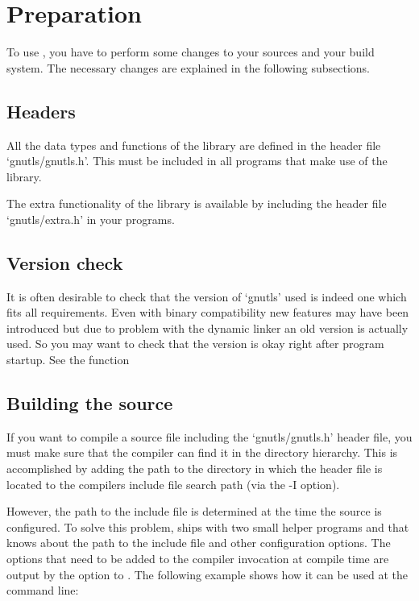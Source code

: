 \section{Preparation}

To use \gnutls{}, you have to perform some changes to your sources and
your build system. The necessary changes are explained in the following
subsections.

\subsection*{Headers}

All the data types and functions of the \gnutls{} library are defined in
the header file `gnutls/gnutls.h'. This must be included in all programs that
make use of the \gnutls{} library.
\par
The extra functionality of the \gnutlse{} library is available by
including the header file `gnutls/extra.h' in your programs.

\subsection*{Version check}
It is often desirable to check that the version of `gnutls' used is indeed
one which fits all requirements.  Even with binary compatibility new
features may have been introduced but due to problem with the dynamic
linker an old version is actually used.  So you may want to check that
the version is okay right after program startup.
See the function 


\subsection*{Building the source}

If you want to compile a source file including the `gnutls/gnutls.h' header
file, you must make sure that the compiler can find it in the
directory hierarchy.  This is accomplished by adding the path to the
directory in which the header file is located to the compilers include
file search path (via the -I option).

However, the path to the include file is determined at the time the
source is configured.  To solve this problem, \gnutls{} ships with two small
helper programs  and 
that knows about the path to the
include file and other configuration options.  The options that need
to be added to the compiler invocation at compile time are output by
the  option to .  The following
example shows how it can be used at the command line:

